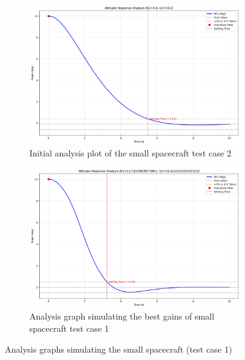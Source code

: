 \documentclass{ifacconf}
\begin{document}
\begin{figure}[H]
    \centering
    \begin{subfigure}[b]{0.48\columnwidth}
        \centering
        \includegraphics[width=\linewidth]{analysis/base_analysis(4).pdf}
        \caption{Initial analysis plot of the small spacecraft test case 2}
        \label{fig:subfig1}
    \end{subfigure}
    \hfill
    \begin{subfigure}[b]{0.48\columnwidth}
        \centering
        \includegraphics[width=\linewidth]{best_gains/analysis/best_analysis(4).pdf}
        \caption{Analysis graph simulating the best gains of small spacecraft test case 1}
        \label{fig:subfig2}
    \end{subfigure}
    \caption{Analysis graphs simulating the small spacecraft (test case 1)}
    \label{fig:combined}
\end{figure}
\end{document}
